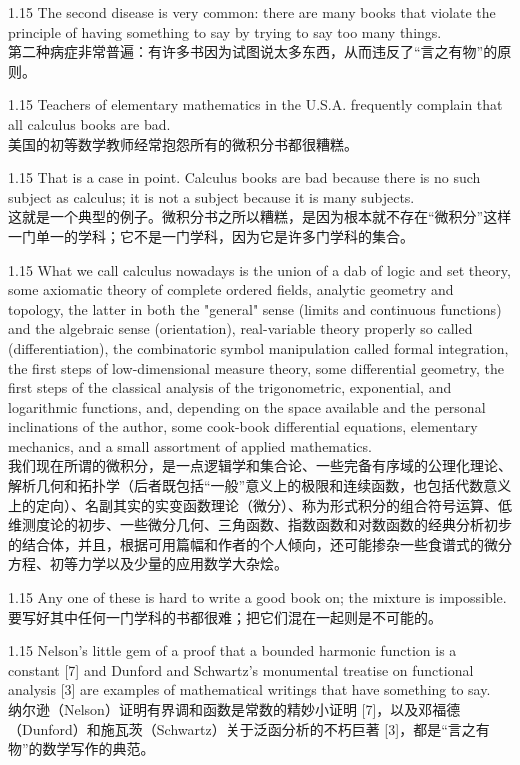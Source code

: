\documentclass[12pt,a4paper]{article}
\newcommand{\bilingual}[2]{
    \begin{spacing}{1.15} %
        \noindent \normalsize #1 \\[-0.5ex] %
        \small \textcolor{blue!70!black}{#2} %
    \end{spacing}
    \vspace{0.8em} %
}
\begin{document}
\bilingual{The second disease is very common: there are many books that violate the principle of having something to say by trying to say too many things.}
{第二种病症非常普遍：有许多书因为试图说太多东西，从而违反了“言之有物”的原则。} %

\bilingual{Teachers of elementary mathematics in the U.S.A. frequently complain that all calculus books are bad.}
{美国的初等数学教师经常抱怨所有的微积分书都很糟糕。} %

\bilingual{That is a case in point. Calculus books are bad because there is no such subject as calculus; it is not a subject because it is many subjects.}
{这就是一个典型的例子。微积分书之所以糟糕，是因为根本就不存在“微积分”这样一门单一的学科；它不是一门学科，因为它是许多门学科的集合。} %

\bilingual{What we call calculus nowadays is the union of a dab of logic and set theory, some axiomatic theory of complete ordered fields, analytic geometry and topology, the latter in both the "general" sense (limits and continuous functions) and the algebraic sense (orientation), real-variable theory properly so called (differentiation), the combinatoric symbol manipulation called formal integration, the first steps of low-dimensional measure theory, some differential geometry, the first steps of the classical analysis of the trigonometric, exponential, and logarithmic functions, and, depending on the space available and the personal inclinations of the author, some cook-book differential equations, elementary mechanics, and a small assortment of applied mathematics.}
{我们现在所谓的微积分，是一点逻辑学和集合论、一些完备有序域的公理化理论、解析几何和拓扑学（后者既包括“一般”意义上的极限和连续函数，也包括代数意义上的定向）、名副其实的实变函数理论（微分）、称为形式积分的组合符号运算、低维测度论的初步、一些微分几何、三角函数、指数函数和对数函数的经典分析初步的结合体，并且，根据可用篇幅和作者的个人倾向，还可能掺杂一些食谱式的微分方程、初等力学以及少量的应用数学大杂烩。} %

\bilingual{Any one of these is hard to write a good book on; the mixture is impossible.}
{要写好其中任何一门学科的书都很难；把它们混在一起则是不可能的。} %

\bilingual{Nelson's little gem of a proof that a bounded harmonic function is a constant [7] and Dunford and Schwartz's monumental treatise on functional analysis [3] are examples of mathematical writings that have something to say.}
{纳尔逊（Nelson）证明有界调和函数是常数的精妙小证明 [7]，以及邓福德（Dunford）和施瓦茨（Schwartz）关于泛函分析的不朽巨著 [3]，都是“言之有物”的数学写作的典范。} %
\end{document}

